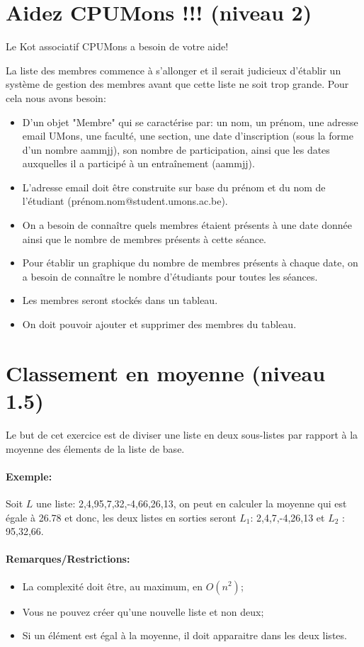 \documentclass[a4paper]{article}
\begin{document}
\section{Aidez CPUMons !!! (niveau 2)}
Le Kot associatif CPUMons a besoin de votre aide! 

La liste des membres commence à s'allonger et il serait judicieux d'établir un système de gestion des membres avant que cette liste ne soit trop grande.
Pour cela nous avons besoin:
\begin{itemize}
\item D'un objet "Membre" qui se caractérise par: un nom, un prénom, une adresse email UMons, une faculté, une section, une date d'inscription (sous la forme d'un nombre aammjj), son nombre de participation, ainsi que les dates auxquelles il a participé à un entraînement (aammjj).
\item L'adresse email doit être construite sur base du prénom et du nom de l'étudiant (prénom.nom@student.umons.ac.be).
\item On a besoin de connaître quels membres étaient présents à une date donnée ainsi que le nombre de membres présents à cette séance.
\item Pour établir un graphique du nombre de membres présents à chaque date, on a besoin de connaître le nombre d'étudiants pour toutes les séances.
\item Les membres seront stockés dans un tableau.
\item On doit pouvoir ajouter et supprimer des membres du tableau.
\end{itemize}

\section{Classement en moyenne (niveau 1.5)}
Le but de cet exercice est de diviser une liste en deux sous-listes par rapport à la moyenne des élements de la liste de base.
\paragraph{Exemple: }
Soit $L$ une liste: {2,4,95,7,32,-4,66,26,13}, on peut en calculer la moyenne qui est égale à 26.78 et donc, les deux listes en sorties seront $L_1$: {2,4,7,-4,26,13} et $L_2$ : {95,32,66}.
\paragraph{Remarques/Restrictions: }
\begin{itemize}
\item La complexité doit être, au maximum, en $O(n^2)$;
\item Vous ne pouvez créer qu'une nouvelle liste et non deux;
\item Si un élément est égal à la moyenne, il doit apparaitre dans les deux listes.
\end{itemize}
\end{document}
